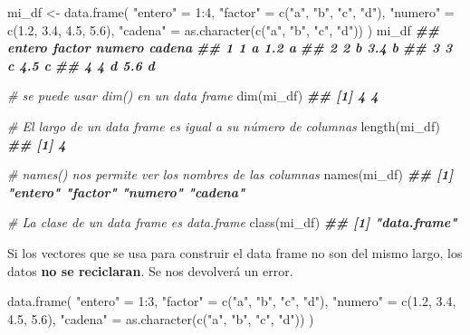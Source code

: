 \documentclass[
]{book}
\newenvironment{Shaded}{\begin{snugshade}}{\end{snugshade}}
\newcommand{\CommentTok}[1]{\textcolor[rgb]{0.56,0.35,0.01}{\textit{#1}}}
\newcommand{\DecValTok}[1]{\textcolor[rgb]{0.00,0.00,0.81}{#1}}
\newcommand{\DocumentationTok}[1]{\textcolor[rgb]{0.56,0.35,0.01}{\textbf{\textit{#1}}}}
\newcommand{\FloatTok}[1]{\textcolor[rgb]{0.00,0.00,0.81}{#1}}
\newcommand{\FunctionTok}[1]{\textcolor[rgb]{0.00,0.00,0.00}{#1}}
\newcommand{\NormalTok}[1]{#1}
\newcommand{\OtherTok}[1]{\textcolor[rgb]{0.56,0.35,0.01}{#1}}
\newcommand{\SpecialCharTok}[1]{\textcolor[rgb]{0.00,0.00,0.00}{#1}}
\newcommand{\StringTok}[1]{\textcolor[rgb]{0.31,0.60,0.02}{#1}}
\begin{document}
\begin{Shaded}
\begin{Highlighting}[]
\NormalTok{mi\_df }\OtherTok{\textless{}{-}} \FunctionTok{data.frame}\NormalTok{(}
                    \StringTok{"entero"} \OtherTok{=} \DecValTok{1}\SpecialCharTok{:}\DecValTok{4}\NormalTok{, }
                    \StringTok{"factor"} \OtherTok{=} \FunctionTok{c}\NormalTok{(}\StringTok{"a"}\NormalTok{, }\StringTok{"b"}\NormalTok{, }\StringTok{"c"}\NormalTok{, }\StringTok{"d"}\NormalTok{), }
                    \StringTok{"numero"} \OtherTok{=} \FunctionTok{c}\NormalTok{(}\FloatTok{1.2}\NormalTok{, }\FloatTok{3.4}\NormalTok{, }\FloatTok{4.5}\NormalTok{, }\FloatTok{5.6}\NormalTok{),}
                    \StringTok{"cadena"} \OtherTok{=} \FunctionTok{as.character}\NormalTok{(}\FunctionTok{c}\NormalTok{(}\StringTok{"a"}\NormalTok{, }\StringTok{"b"}\NormalTok{, }\StringTok{"c"}\NormalTok{, }\StringTok{"d"}\NormalTok{))}
\NormalTok{                    )}
\NormalTok{mi\_df}
\DocumentationTok{\#\#   entero factor numero cadena}
\DocumentationTok{\#\# 1      1      a    1.2      a}
\DocumentationTok{\#\# 2      2      b    3.4      b}
\DocumentationTok{\#\# 3      3      c    4.5      c}
\DocumentationTok{\#\# 4      4      d    5.6      d}

\CommentTok{\# se puede usar dim() en un data frame}
\FunctionTok{dim}\NormalTok{(mi\_df)}
\DocumentationTok{\#\# [1] 4 4}

\CommentTok{\# El largo de un data frame es igual a su número de columnas}
\FunctionTok{length}\NormalTok{(mi\_df)}
\DocumentationTok{\#\# [1] 4}

\CommentTok{\# names() nos permite ver los nombres de las columnas}
\FunctionTok{names}\NormalTok{(mi\_df)}
\DocumentationTok{\#\# [1] "entero" "factor" "numero" "cadena"}

\CommentTok{\# La clase de un data frame es data.frame}
\FunctionTok{class}\NormalTok{(mi\_df) }
\DocumentationTok{\#\# [1] "data.frame"}
\end{Highlighting}
\end{Shaded}

Si los vectores que se usa para construir el data frame no son del mismo largo, los datos \textbf{no se reciclaran}. Se nos devolverá un error.

\begin{Shaded}
\begin{Highlighting}[]
\FunctionTok{data.frame}\NormalTok{(}
  \StringTok{"entero"} \OtherTok{=} \DecValTok{1}\SpecialCharTok{:}\DecValTok{3}\NormalTok{, }
  \StringTok{"factor"} \OtherTok{=} \FunctionTok{c}\NormalTok{(}\StringTok{"a"}\NormalTok{, }\StringTok{"b"}\NormalTok{, }\StringTok{"c"}\NormalTok{, }\StringTok{"d"}\NormalTok{), }
  \StringTok{"numero"} \OtherTok{=} \FunctionTok{c}\NormalTok{(}\FloatTok{1.2}\NormalTok{, }\FloatTok{3.4}\NormalTok{, }\FloatTok{4.5}\NormalTok{, }\FloatTok{5.6}\NormalTok{),}
  \StringTok{"cadena"} \OtherTok{=} \FunctionTok{as.character}\NormalTok{(}\FunctionTok{c}\NormalTok{(}\StringTok{"a"}\NormalTok{, }\StringTok{"b"}\NormalTok{, }\StringTok{"c"}\NormalTok{, }\StringTok{"d"}\NormalTok{))}
\NormalTok{)}
\end{Highlighting}
\end{Shaded}
\end{document}
